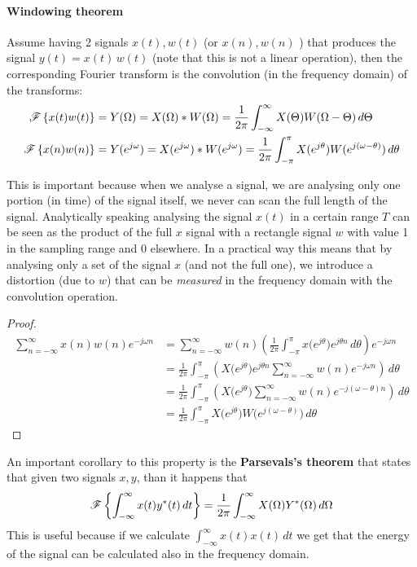		\paragraph{Windowing theorem} Assume having 2 signals $x(t),w(t)$ (or $x(n), w(n)$ ) that produces the signal $y(t) = x(t) \, w(t)$ (note that this is not a linear operation), then the corresponding Fourier transform is the convolution (in the frequency domain) of the transforms:
		\begin{equation} \label{eq:four:windowing}
		\begin{split}
			\mathscr{F}\left\{ x(t)w(t) \right\} & = Y(\Omega) = X(\Omega)*W(\Omega) = \frac 1 {2\pi} \int_{-\infty}^{\infty} X(\Theta) W(\Omega - \Theta)\, d\Theta \\
			\mathscr{F}\left\{ x(n)w(n) \right\} & =  Y(e^{j\omega}) = X(e^{j\omega}) * W(e^{j\omega}) = \frac 1 {2\pi} \int_{-\pi}^\pi X(e^{j\theta}) W(e^{j(\omega-\theta)}) \, d\theta
		\end{split}
		\end{equation}
		
		This is important because when we analyse a signal, we are analysing only one portion (in time) of the signal itself, we never can scan the full length of the signal. Analytically speaking analysing the signal $x(t)$ in a certain range $T$ can be seen as the product of the full $x$ signal with a rectangle signal $w$ with value 1 in the sampling range and 0 elsewhere. In a practical way this means that by analysing only a set of the signal $x$ (and not the full one), we introduce a distortion (due to $w$) that can be \textit{measured} in the frequency domain with the convolution operation.
		
		\begin{proof}
		\begin{align*}
			\sum_{n=-\infty}^\infty x(n) w(n) e^{-j\omega n} & = \sum_{n=-\infty}^\infty w(n) \left( \frac 1 {2\pi} \int_{-\pi}^\pi x\big(e^{j\theta}\big) e^{j\theta n} \, d\theta \right) e^{-j\omega n} \\
			& = \frac 1 {2\pi} \int_{-\pi}^\pi \left( X\big(e^{j\theta}\big) e^{j\theta n} \sum_{n=-\infty}^\infty w(n) e^{-j\omega n} \right) \, d\theta \\
			& = \frac 1 {2\pi} \int_{-\pi}^\pi \left( X\big(e^{j\theta}\big)  \sum_{n=-\infty}^\infty w(n) e^{-j(\omega-\theta) n} \right) \, d\theta \\
			& = \frac 1 {2\pi} \int_{-\pi}^\pi X\big(e^{j\theta}\big) W \big(e^{j(\omega - \theta)}\big) \, d\theta
		\end{align*}
		\end{proof}
		An important corollary to this property is the \textbf{Parsevals's theorem} that states that given two signals $x,y$, than it happens that
		\begin{equation} \label{eq:four:parserval}
			\mathscr{F}\left\{ \int_{-\infty}^\infty x(t) y^* (t)\, dt \right\} = \frac 1 {2\pi} \int_{-\infty} ^\infty X(\Omega) Y^*(\Omega)\, d\Omega
		\end{equation}
		This is useful because if we calculate $\int_{-\infty}^\infty x(t)x(t)\, dt$ we get that the energy of the signal can be calculated also in the frequency domain.
		
